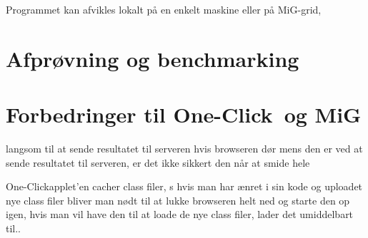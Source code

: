 \documentclass[pdf,draft,a4paper,11pt]{article}
\newcommand{\mig}{MiG}
\newcommand{\oc}{One-Click}
\begin{document}
Programmet kan afvikles lokalt på en enkelt maskine eller på \mig-grid,  



\section{Afprøvning og benchmarking}



\section{Forbedringer til \oc\ og \mig}
%
langsom til at sende resultatet til serveren hvis browseren dør mens den er ved
at sende resultatet til serveren, er det ikke sikkert den når at smide hele

\oc applet'en cacher class filer, s hvis man har ænret i sin kode og
uploadet nye class filer bliver man nødt til at lukke browseren helt ned og
starte den op igen, hvis man vil have den til at loade de nye class filer, lader
det umiddelbart til.. 
\end{document}
